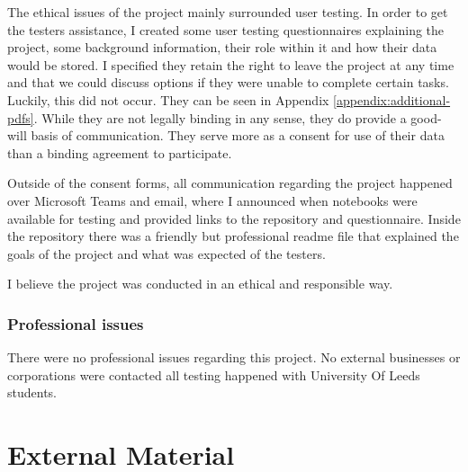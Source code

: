 \begin{appendices}
The ethical issues of the project mainly surrounded user testing. In order to get the testers assistance, I created some user testing questionnaires explaining the project, some background information, their role within it and how their data would be stored. I specified they retain the right to leave the project at any time and that we could discuss options if they were unable to complete certain tasks. Luckily, this did not occur. They can be seen in Appendix \ref{appendix:additional-pdfs}. While they are not legally binding in any sense, they do provide a good-will basis of communication. They serve more as a consent for use of their data than a binding agreement to participate.

Outside of the consent forms, all communication regarding the project happened over Microsoft Teams and email, where I announced when notebooks were available for testing and provided links to the repository and questionnaire. Inside the repository there was a friendly but professional readme file that explained the goals of the project and what was expected of the testers.

I believe the project was conducted in an ethical and responsible way.

\subsection{Professional issues}

There were no professional issues regarding this project. No external businesses or corporations were contacted all testing happened with University Of Leeds students.

%
%
\chapter{External Material}


\end{appendices}
